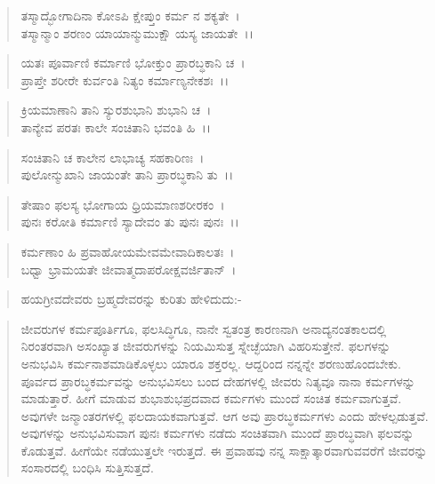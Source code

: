 \begin{verse}
ತಸ್ಮಾದ್ಭೋಗಾದಿನಾ ಕೋಽಪಿ ಕ್ಷೇಪ್ತುಂ ಕರ್ಮ ನ ಶಕ್ಯತೇ~।\\ ತಸ್ಮಾನ್ಮಾಂ ಶರಣಂ ಯಾಯಾನ್ಮುಮುಕ್ಷೌ ಯಸ್ಯ ಜಾಯತೇ~।।
\end{verse}

\begin{verse}
ಯತಃ ಪೂರ್ವಾಣಿ ಕರ್ಮಾಣಿ ಭೋಕ್ತುಂ ಪ್ರಾರಬ್ಧಕಾನಿ ಚ~।\\ ಪ್ರಾಪ್ತೇ ಶರೀರೇ ಕುರ್ವಂತಿ ನಿತ್ಯಂ ಕರ್ಮಾಣ್ಯನೇಕಶಃ~।।
\end{verse}

\begin{verse}
ಕ್ರಿಯಮಾಣಾನಿ ತಾನಿ ಸ್ಯುರಶುಭಾನಿ ಶುಭಾನಿ ಚ~।\\ ತಾನ್ಯೇವ ಪರತಃ ಕಾಲೇ ಸಂಚಿತಾನಿ ಭವಂತಿ ಹಿ~।।
\end{verse}

\begin{verse}
ಸಂಚಿತಾನಿ ಚ ಕಾಲೇನ ಲಾಭಾಚ್ಯ ಸಹಕಾರಿಣಃ~।\\ ಪುಲೋನ್ಮುಖಾನಿ ಜಾಯಂತೇ ತಾನಿ ಪ್ರಾರಬ್ಧಕಾನಿ ತು~।।
\end{verse}

\begin{verse}
ತೇಷಾಂ ಫಲಸ್ಯ ಭೋಗಾಯ ಧ್ರಿಯಮಾಣಶರೀರಕಂ~।\\ ಪುನಃ ಕರೋತಿ ಕರ್ಮಾಣಿ ಸ್ಯಾದೇವಂ ತು ಪುನಃ ಪುನಃ~।।
\end{verse}

\begin{verse}
ಕರ್ಮಣಾಂ ಹಿ ಪ್ರವಾಹೋಯಮೇವಮೇವಾದಿಕಾಲತಃ~।\\ ಬಧ್ವಾ ಭ್ರಾಮಯತೇ ಜೀವಾತ್ಮದಾಪರೋಕ್ಷವರ್ಜಿತಾನ್~।
\end{verse}


\begin{verse}
ಹಯಗ್ರೀವದೇವರು ಬ್ರಹ್ಮದೇವರನ್ನು ಕುರಿತು ಹೇಳಿದುದು:-
\end{verse}

\begin{verse}
ಜೀವರುಗಳ ಕರ್ಮಪೂರ್ತಿಗೂ, ಫಲಸಿದ್ಧಿಗೂ, ನಾನೇ ಸ್ವತಂತ್ರ ಕಾರಣನಾಗಿ ಅನಾದ್ಯನಂತಕಾಲದಲ್ಲಿ ನಿರಂತರವಾಗಿ ಅಸಂಖ್ಯಾತ ಜೀವರುಗಳನ್ನು ನಿಯಮಿಸುತ್ತ ಸ್ನೇಚ್ಛೆಯಾಗಿ ವಿಹರಿಸುತ್ತೇನೆ. ಫಲಗಳನ್ನು ಅನುಭವಿಸಿ ಕರ್ಮನಾಶಮಾಡಿಕೊಳ್ಳಲು ಯಾರೂ ಶಕ್ತರಲ್ಲ. ಆದ್ದರಿಂದ ನನ್ನನ್ನೇ ಶರಣುಹೊಂದಬೇಕು. ಪೂರ್ವದ ಪ್ರಾರಬ್ಧಕರ್ಮವನ್ನು ಅನುಭವಿಸಲು ಬಂದ ದೇಹಗಳಲ್ಲಿ ಜೀವರು ನಿತ್ಯವೂ ನಾನಾ ಕರ್ಮಗಳನ್ನು ಮಾಡುತ್ತಾರೆ. ಹೀಗೆ ಮಾಡುವ ಶುಭಾಶುಭಪ್ರದವಾದ ಕರ್ಮಗಳು ಮುಂದೆ ಸಂಚಿತ ಕರ್ಮವಾಗುತ್ತವೆ. ಅವುಗಳೇ ಜನ್ಮಾಂತರಗಳಲ್ಲಿ ಫಲದಾಯಕವಾಗುತ್ತವೆ. ಆಗ ಅವು ಪ್ರಾರಬ್ಧಕರ್ಮಗಳು ಎಂದು ಹೇಳಲ್ಪಡುತ್ತವೆ. ಅವುಗಳನ್ನು ಅನುಭವಿಸುವಾಗ ಪುನಃ ಕರ್ಮಗಳು ನಡೆದು ಸಂಚಿತವಾಗಿ ಮುಂದೆ ಪ್ರಾರಬ್ಧವಾಗಿ ಫಲವನ್ನು ಕೊಡುತ್ತವೆ. ಹೀಗೆಯೇ ನಡೆಯುತ್ತಲೇ ಇರುತ್ತದೆ. ಈ ಪ್ರವಾಹವು ನನ್ನ ಸಾಕ್ಷಾತ್ಕಾರವಾಗುವವರೆಗೆ ಜೀವರನ್ನು ಸಂಸಾರದಲ್ಲಿ ಬಂಧಿಸಿ ಸುತ್ತಿಸುತ್ತದೆ.
\end{verse}

